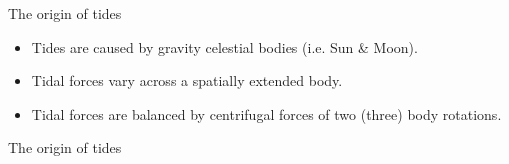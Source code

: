 \begin{frame}
  \begin{PointSix}{The origin of tides}
      \begin{itemize}
        \item Tides are caused by gravity celestial bodies (i.e. Sun \& Moon).
        \item Tidal forces vary across a spatially extended body.
        \item Tidal forces are balanced by centrifugal forces of two (three) body rotations.
      \end{itemize}
  \end{PointSix}
\end{frame}

\begin{frame}
  \begin{PointSix}{The origin of tides}
  \end{PointSix}
\end{frame}

